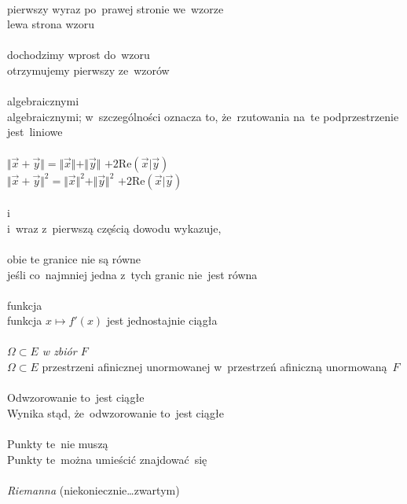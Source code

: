 \documentclass[a4paper,11pt]{article}
\begin{document}
 \\
\Jest pierwszy wyraz po~prawej stronie we~wzorze \\
\Powin  lewa strona wzoru \\
 \\
\Jest dochodzimy wprost do~wzoru \\
\Powin  otrzymujemy pierwszy ze~wzorów \\
 \\
\Jest algebraicznymi \\
\Powin algebraicznymi; w~szczególności oznacza to, że~rzutowania na~te
podprzestrzenie jest~liniowe \\
 \\
\Jest
$\Vert \vec{ x } + \vec{ y } \Vert = \Vert \vec{ x } \Vert + \Vert \vec{ y } \Vert$
$+ 2 \mathrm{Re}( \vec{ x } | \vec{ y } )$ \\
\Powin $\Vert \vec{ x } + \vec{ y } \Vert^{ 2 } = \Vert \vec{ x } \Vert^{ 2 }
+ \Vert \vec{ y } \Vert^{ 2 }$ $+ 2 \mathrm{Re}( \vec{ x } | \vec{ y } )$ \\
 \\
\Jest i \\
\Powin i~wraz z~pierwszą częścią dowodu wykazuje, \\
 \\
\Jest obie te granice nie są równe \\
\Powin  jeśli co~najmniej jedna z~tych granic nie~jest równa \\
 \\
\Jest funkcja \\
\Powin  funkcja $x \mapsto f'( x )$ jest jednostajnie ciągła \\
 \\
\Jest \textit{$\Omega \subset E$ w zbiór $F$} \\
\Powin $\Omega \subset E$ przestrzeni afinicznej unormowanej
w~przestrzeń afiniczną unormowaną~$F$ \\
 \\
\Jest Odwzorowanie to~jest ciągłe \\
\Powin  Wynika stąd, że~odwzorowanie to~jest ciągłe \\
 \\
\Jest Punkty te~nie muszą \\
\Powin  Punkty te~można umieścić znajdować~się \\
 \\
\Jest  \textit{Riemanna} (niekoniecznie\ldots zwartym) \\
\end{document}
